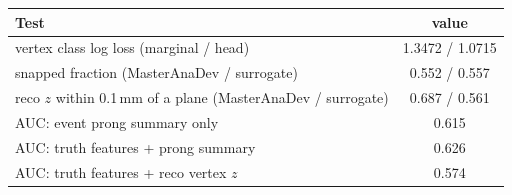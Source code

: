 \begin{tabular}{lc}
\toprule
Test & value \\
\midrule
vertex class log loss (marginal / head) & 1.3472 / 1.0715 \\
snapped fraction (MasterAnaDev / surrogate) & 0.552 / 0.557 \\
reco $z$ within 0.1\,mm of a plane (MasterAnaDev / surrogate) & 0.687 / 0.561 \\
\midrule
AUC: event prong summary only & 0.615 \\
AUC: truth features + prong summary & 0.626 \\
AUC: truth features + reco vertex $z$ & 0.574 \\
\bottomrule
\end{tabular}
